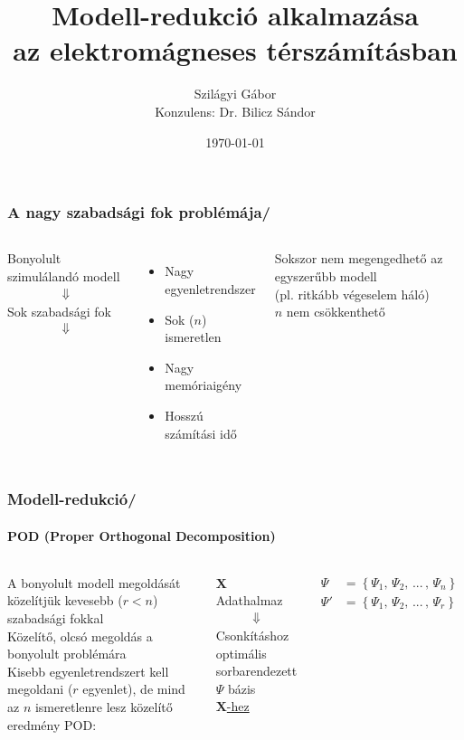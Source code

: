 \documentclass[aspectratio=43]{beamer}
\title{Modell-redukció alkalmazása\\az elektromágneses térszámításban}			%
\date{\today}
\author{Szilágyi Gábor\\[3ex]Konzulens: Dr. Bilicz Sándor}	%
\newcommand{\numframetitle}[1]{\frametitle{#1\hfill\insertframenumber/\insertpresentationendpage\hspace{-\fill}}}
\begin{document}
\maketitle	%
\begin{frame}
	\numframetitle{A nagy szabadsági fok problémája}
	\begin{columns}
            \begin{center}
    		    Bonyolult szimulálandó modell
                \begin{align*}
                    \Downarrow
                \end{align*}
                Sok szabadsági fok
                \begin{align*}
                    \Downarrow
                \end{align*}
            \end{center}
            \begin{itemize}
                \item Nagy egyenletrendszer
                \item Sok ($n$) ismeretlen
                \item Nagy memóriaigény
                \item Hosszú számítási idő
            \end{itemize}
	        Sokszor nem megengedhető az egyszerűbb modell\\[3ex]
            (pl. ritkább végeselem háló)\\[3ex]
            $n$ nem csökkenthető
    \end{columns}
\end{frame}
\begin{frame}
	\numframetitle{Modell-redukció}
    \framesubtitle{POD (Proper Orthogonal Decomposition)}
	\begin{columns}
            A bonyolult modell megoldását közelítjük kevesebb ($r< n$) szabadsági fokkal\\[3ex]
            Közelítő, olcsó megoldás a bonyolult problémára\\[3ex]
            Kisebb egyenletrendszert kell megoldani ($r$ egyenlet), de mind az $n$ ismeretlenre lesz közelítő eredmény
            POD:\\[3ex]
            \begin{center}
                $\mathbf{X}$ Adathalmaz
                \begin{align*}
                    \Downarrow
                \end{align*}
                Csonkításhoz optimális\\ sorbarendezett $\Psi$ bázis\\[1ex] \large\underline{$\mathbf{X}$-hez}\normalsize
            \end{center}
            \begin{align*}
                \Psi &= \left\{ \Psi_1,\,\Psi_2,\,...\,,\,\Psi_n\right\}\\
                \Psi' &= \left\{ \Psi_1,\,\Psi_2,\,...\,,\,\Psi_r\right\}
            \end{align*}
	\end{columns}
\end{frame}
\end{document}
